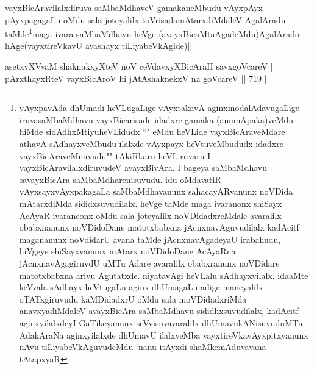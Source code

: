 \begin{artha}
vayxBicAravilalxdiruva saMbaMdhaveV gamakaneMbudu vAyxpAyx pAyxpagagaLu oMdu sala joteyalilx toVrisadamAtarxdiMdaleV AgalAradu taMde\footnote{vAyxpavAda dhUmadi heVLugaLige vAyxtakavA aginxmodalAdavugaLige iruvasaMbaMdhavu vayxBicarisade idadxre gamaka (anumApaka)veMdu hiMde sidAdhxMtiyuheVLidudx ``\stext" eMdu heVLide vayxBicAraveMdare athavA sAdhayxveMbudu ilalxde vAyxpayx heVtuveMbududx idadxre vayxBicAraveMnuvudu"\stext" tAkiRkaru heVLiruvaru I vayxBicAravilalxdiruvudeV avayxBivAra. I bageya saMbaMdhavu savayxBicAra saMbaMdharenisuvudu. idu oMdavatiR vAyxsayxvAyxpakagaLa saMbaMdhavanunx sahacayARvanunx noVDida mAtarxdiMda sididxsuvudilalx. heVge taMde maga ivaranonx shiSayx AcAyaR ivaraneonx oMdu sala joteyalilx noVDidadxreMdale avaralilx obabxnanunx noVDidoDane matotxbabxna jAcnxnavAguvudilalx kadAcitf magananunx noVdidarU avana taMde jAcnxnavAgadeyaU irabahudu, hiVgeye shiSayxvanunx mAtarx noVDidoDane AcAyaRna jAcnxnavAgagiruvdU uMTu  Adare avaralilx obabxranunx noVDidare matotxbabxna arivu Agutatxde. niyatavAgi heVLalu sAdhayxvilalx. idaaMte keVvala sAdhayx heVtugaLu aginx dhUmagaLu adige maneyalilx oTATxgiruvudu kaMDidadxrU oMdu sala moVDidadxriMda anavxyadiMdaleV avayxBicAra saMbaMdhavu sididhxsuvudilalx, kadAcitf aginxyilalxdeyI GaTikeyanunx seVvisuvavaralilx dhUmavukANisuvuduMTu. AdakAraNa aginxyilalxde dhUmavU ilalxveMba vayxtireVkavAyxpitxyanunx nAvu tiLiyabeVkAguvudeMdu `nanu itAyxdi shaMkemAduvavana tAtapxyaR}maga ivara saMbaMdhavu heVge (avayxBicaMtaAgadeMdu)AgalArado hAge(vayxtireVkavU avashayx tiLiyabeVkAgide)||
\end{artha}


\begin{shl}
asetxvXVvaM shaknakxyXteV noV ceVdavxyXBicAraH savxgoVcareV | \\
pArxthayxRteV vayxBicAroV hi jAtAshaknekxV na goVcareV \hfill||  719 ||  
\end{shl}

